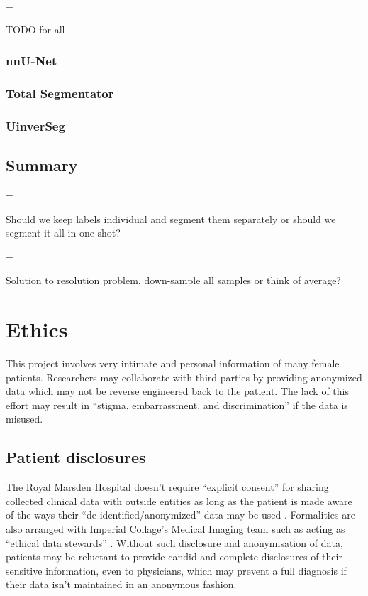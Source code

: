 \documentclass[11pt,twoside]{report}
\newenvironment{warning}
  {\par\begin{mdframed}[linewidth=1pt,linecolor=black]%
    \begin{list}{}{\leftmargin=1cm
                   \labelwidth=\leftmargin}\item[\Large\ding{43}]}
  {\end{list}\end{mdframed}\par}
\begin{document}
\begin{warning}
  TODO for all
\end{warning}

\subsection{nnU-Net}\label{sect:results-nnu-net}

\subsection{Total Segmentator}\label{sect:results-totalseg}

\subsection{UinverSeg}\label{sect:results-universeg}

\section{Summary}\label{sect:results-summary}


\begin{warning}
  Should we keep labels individual and segment them separately or should we segment it all in one shot?
\end{warning}

\begin{warning}
  Solution to resolution problem, down-sample all samples or think of average?
\end{warning}

\chapter{Ethics}\label{sect:ethics}

This project involves very intimate and personal information of many female patients. Researchers may collaborate with third-parties by providing anonymized data which may not be reverse engineered back to the patient.
The lack of this effort may result in ``stigma, embarrassment, and discrimination'' \cite{health-privacy} if the data is misused.

\section{Patient disclosures}\label{sect:patient-disclosures}

The Royal Marsden Hospital doesn't require ``explicit consent'' for sharing collected clinical data with outside entities as long as the patient is made aware of the ways their ``de-identified/anonymized'' data may be used  \cite{royal-marsden-privacy-note}. Formalities are also arranged with Imperial Collage's Medical Imaging team such as acting as ``ethical data stewards'' \cite{ethics-imaging-AI}. Without such disclosure and anonymisation of data, patients may be reluctant to provide candid and complete disclosures of their sensitive information, even to physicians, which may prevent a full diagnosis if their data isn't maintained in an anonymous fashion.
\end{document}
